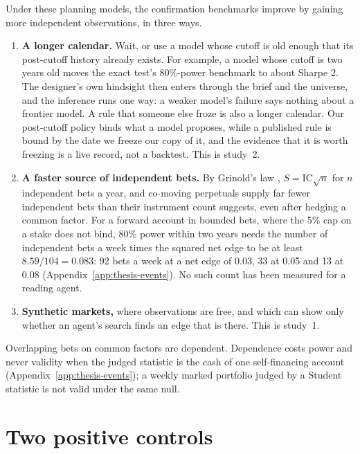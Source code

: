 \documentclass[11pt]{article}
\begin{document}
Under these planning models, the confirmation benchmarks improve by gaining more independent observations, in three ways.
\begin{enumerate}
  \item \textbf{A longer calendar.} Wait, or use a model whose cutoff is old enough that its post-cutoff history already exists. For example, a model whose cutoff is two years old moves the exact test's 80\%-power benchmark to about Sharpe 2. The designer's own hindsight then enters through the brief and the universe, and the inference runs one way: a weaker model's failure says nothing about a frontier model. A rule that someone else froze is also a longer calendar. Our post-cutoff policy binds what a model proposes, while a published rule is bound by the date we freeze our copy of it, and the evidence that it is worth freezing is a live record, not a backtest. This is study~2.
  \item \textbf{A faster source of independent bets.} By Grinold's law \cite{grinold1989}, $S=\mathrm{IC}\sqrt{n}$ for $n$ independent bets a year, and co-moving perpetuals supply far fewer independent bets than their instrument count suggests, even after hedging a common factor. For a forward account in bounded bets, where the 5\% cap on a stake does not bind, 80\% power within two years needs the number of independent bets a week times the squared net edge to be at least $8.59/104=0.083$: 92 bets a week at a net edge of 0.03, 33 at 0.05 and 13 at 0.08 (Appendix~\ref{app:thesis-events}). No such count has been measured for a reading agent.
  \item \textbf{Synthetic markets,} where observations are free, and which can show only whether an agent's search finds an edge that is there. This is study~1.
\end{enumerate}
Overlapping bets on common factors are dependent. Dependence costs power and never validity when the judged statistic is the cash of one self-financing account (Appendix~\ref{app:thesis-events}); a weekly marked portfolio judged by a Student statistic is not valid under the same null.

\section{Two positive controls}\label{sec:program}
\end{document}
